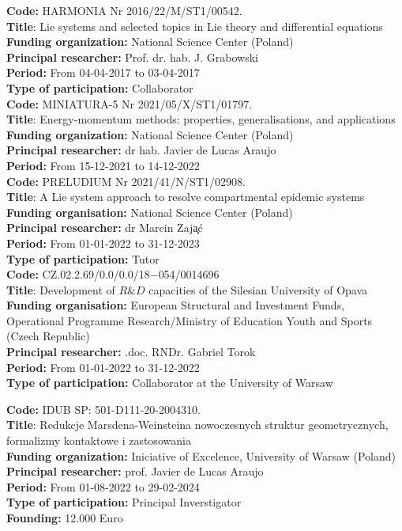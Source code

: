 \documentclass[12pt,reqno]{amsbook}
\begin{document}
\noindent
{\bf Code:} HARMONIA Nr 2016/22/M/ST1/00542.\\
{\bf Title}: Lie systems and selected topics in Lie theory and differential equations\\
{\bf Funding organization:} National Science Center (Poland)\\
{\bf Principal researcher:} Prof. dr. hab. J. Grabowski\\
{\bf Period:} From 04-04-2017 to 03-04-2017\\
{\bf Type of participation:} Collaborator\\

\noindent
{\bf Code:} MINIATURA-5 Nr 2021/05/X/ST1/01797.\\
{\bf Title}: Energy-momentum methods: properties, generalisations, and applications\\
{\bf Funding organization:} National Science Center (Poland)\\
{\bf Principal researcher:} dr hab. Javier de Lucas Araujo\\
{\bf Period:} From 15-12-2021 to 14-12-2022\\

\noindent
{\bf Code:} PRELUDIUM Nr 2021/41/N/ST1/02908.\\
{\bf Title}: A Lie system approach to resolve compartmental epidemic systems\\
{\bf Funding organisation:} National Science Center (Poland)\\
{\bf Principal researcher:} dr Marcin Zaj\c a\'c\\
{\bf Period:} From 01-01-2022 to 31-12-2023\\
{\bf Type of participation:} Tutor\\
\vskip 0.5cm
\noindent
{\bf Code:} CZ.02.2.69/0.0/0.0/18$-$054/0014696\\
{\bf Title}: Development of $R\&D$ capacities of the Silesian University of Opava \\
{\bf Funding organisation:} European Structural and Investment Funds, Operational Programme Research/Ministry of Education Youth and Sports (Czech Republic)\\
{\bf Principal researcher:} .doc. RNDr. Gabriel Torok\\
{\bf Period:} From 01-01-2022 to 31-12-2022\\
{\bf Type of participation:} Collaborator at the University of Warsaw\\
\vskip 0.5cm

\noindent
{\bf Code:} IDUB  SP: 501-D111-20-2004310.\\
{\bf Title}: Redukcje Marsdena-Weinsteina nowoczesnych struktur geometrycznych, formalizmy kontaktowe i zastosowania\\
{\bf Funding organization:} Iniciative of Excelence, University of Warsaw (Poland)\\
{\bf Principal researcher:} prof. Javier de Lucas Araujo\\
{\bf Period:} From 01-08-2022 to 29-02-2024\\
{\bf Type of participation:} Principal Inverstigator\\
{\bf Founding:} 12.000 Euro\\
\vskip 0.5cm
\end{document}
